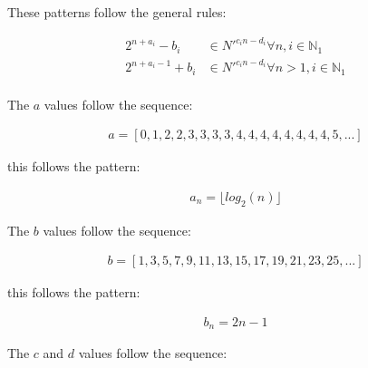 \documentclass{article}
\begin{document}
\noindent
These patterns follow the general rules:

\begin{displaymath}\begin{aligned}
2^{n+a_{i}}-b_{i}   & \in N'^{c_{i}n-d_{i}}\forall n, i   \in \mathbb{N}_{1} \\
2^{n+a_{i}-1}+b_{i} & \in N'^{c_{i}n-d_{i}}\forall n>1, i \in \mathbb{N}_{1} \\
\end{aligned}\end{displaymath}

\noindent
The \begin{math}a\end{math} values follow the sequence:

\begin{displaymath}\begin{aligned}
a = [0, 1, 2, 2, 3, 3, 3, 3, 4, 4, 4, 4, 4, 4, 4, 4, 5, ...]
\end{aligned}\end{displaymath}

\noindent
this follows the pattern:

\begin{displaymath}\begin{aligned}
a_n = \lfloor log_2(n) \rfloor
\end{aligned}\end{displaymath}

\noindent
The \begin{math}b\end{math} values follow the sequence:

\begin{displaymath}\begin{aligned}
b = [1, 3, 5, 7, 9, 11, 13, 15, 17, 19, 21, 23, 25, ...]
\end{aligned}\end{displaymath}

\noindent
this follows the pattern:

\begin{displaymath}\begin{aligned}
b_n = 2n-1
\end{aligned}\end{displaymath}

\noindent
The \begin{math}c\end{math} and \begin{math}d\end{math} values follow the
sequence:
\end{document}
